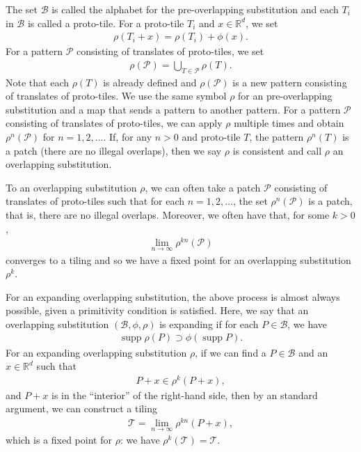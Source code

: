 \documentclass[a4]{amsart}
\DeclareMathOperator{\supp}{supp}
\theoremstyle{definition}
\begin{document}
The set $\mathcal{B}$ is called the alphabet for the pre-overlapping substitution and
each $T_i$ in $\mathcal{B}$ is called a proto-tile. For a proto-tile $T_i$ and $x\in\mathbb{R}^d$, we set
\begin{align*}
     \rho(T_i+x)=\rho(T_i)+\phi(x).
\end{align*}
For a pattern $\mathcal{P}$ consisting of translates of proto-tiles, we set
\begin{align*}
    \rho(\mathcal{P})=\bigcup_{T\in\mathcal{P}}\rho(T).
\end{align*}
Note that each $\rho(T)$ is already defined and $\rho(\mathcal{P})$ is a new pattern consisting of
translates of proto-tiles.
We use the same symbol $\rho$ for an pre-overlapping substitution and a map that sends a pattern to
another pattern. For a pattern $\mathcal{P}$ consisting of translates of proto-tiles, we can apply $\rho$ multiple times and
obtain $\rho^n(\mathcal{P})$ for $n=1,2,\ldots$.
If, for any $n>0$ and
proto-tile $T$, the
pattern $\rho^n(T)$ is a
patch (there are no illegal overlaps), then we say $\rho$ is consistent and call $\rho$ an overlapping substitution.

To an overlapping substitution $\rho$, we can often take a patch $\mathcal{P}$ consisting of translates of proto-tiles such that for each $n=1,2,\ldots$, the set $\rho^n(\mathcal{P})$ is a patch, that is, there are no
illegal overlaps.
Moreover, we often have that, for some $k>0$,
\begin{align*}
       \lim_{n\rightarrow\infty}\rho^{kn}(\mathcal{P})
\end{align*}
converges to a tiling
and so we have a fixed point for an overlapping substitution $\rho^k$.

For an expanding overlapping substitution,
the above process is
almost always possible,
given a primitivity condition is satisfied.
Here, we say that an overlapping substitution $(\mathcal{B},\phi,\rho)$ is expanding if
for each $P\in\mathcal{B}$, we have
\begin{align*}
\supp\rho(P)\supset\phi(\supp P).
\end{align*}
For an expanding overlapping substitution $\rho$, if we can find a $P\in\mathcal{B}$ 
and an $x\in\mathbb{R}^d$ such that
\begin{align*}
 P+x\in\rho^k(P+x),
\end{align*}
and $P+x$ is in the ``interior'' of the right-hand side,
then by an standard argument, we can construct a tiling
\begin{align*}
 \mathcal{T}=\lim_{n\rightarrow\infty}\rho^{kn}(P+x),
\end{align*}
which is a fixed point for $\rho$: we have $\rho^k(\mathcal{T})=\mathcal{T}$.
\end{document}
